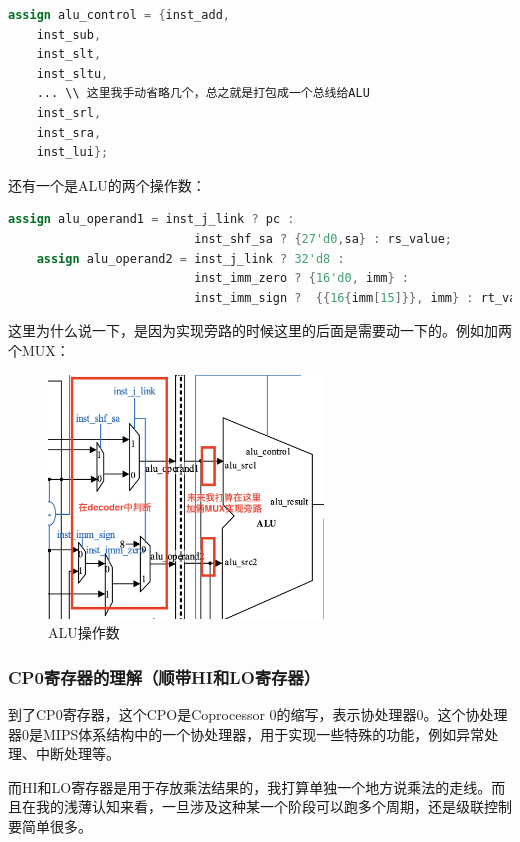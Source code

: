 \documentclass[a4paper]{article}
\begin{document}
\begin{lstlisting}[language=Verilog]    
    assign alu_control = {inst_add,         
    inst_sub,
    inst_slt,
    inst_sltu,
    ... \\ 这里我手动省略几个，总之就是打包成一个总线给ALU
    inst_srl,
    inst_sra,
    inst_lui};
\end{lstlisting}

还有一个是ALU的两个操作数：

\begin{lstlisting}[language=Verilog]
    assign alu_operand1 = inst_j_link ? pc : 
                          inst_shf_sa ? {27'd0,sa} : rs_value;
    assign alu_operand2 = inst_j_link ? 32'd8 :  
                          inst_imm_zero ? {16'd0, imm} :
                          inst_imm_sign ?  {{16{imm[15]}}, imm} : rt_value;
\end{lstlisting}    

这里为什么说一下，是因为实现旁路的时候这里的后面是需要动一下的。例如加两个MUX：

\begin{figure}[H]
    \centering
    \includegraphics[width=0.65\textwidth]{img/复现流水线/ALU操作数.png}
    \caption{ALU操作数}
    \label{fig:ALU操作数}
\end{figure}

\subsubsection{CP0寄存器的理解（顺带HI和LO寄存器）}

到了CP0寄存器，这个CPO是Coprocessor 0的缩写，表示协处理器0。这个协处理器0是MIPS体系结构中的一个协处理器，用于实现一些特殊的功能，例如异常处理、中断处理等。

而HI和LO寄存器是用于存放乘法结果的，我打算单独一个地方说乘法的走线。而且在我的浅薄认知来看，一旦涉及这种某一个阶段可以跑多个周期，还是级联控制要简单很多。
\end{document}
